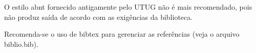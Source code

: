 \documentclass[ppgc,ti]{iiufrgs}
\begin{document}
O estilo abnt fornecido antigamente pelo UTUG não é mais recomendado, pois não
produz saída de acordo com as exigências da biblioteca.

Recomenda-se o uso de bibtex para gerenciar as referências (veja o arquivo
biblio.bib).

%

%



\end{document}

